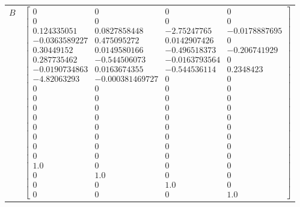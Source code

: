 \begin{tabular}{cl}
   $B$    & $\left[\begin{matrix}0 & 0 & 0 & 0\\0 & 0 & 0 & 0\\0.124335051 & 0.0827858448 & -2.75247765 & -0.0178887695\\-0.0363589227 & 0.475095272 & 0.0142907426 & 0\\0.30449152 & 0.0149580166 & -0.496518373 & -0.206741929\\0.287735462 & -0.544506073 & -0.0163793564 & 0\\-0.0190734863 & 0.0163674355 & -0.544536114 & 0.2348423\\-4.82063293 & -0.000381469727 & 0 & 0\\0 & 0 & 0 & 0\\0 & 0 & 0 & 0\\0 & 0 & 0 & 0\\0 & 0 & 0 & 0\\0 & 0 & 0 & 0\\0 & 0 & 0 & 0\\0 & 0 & 0 & 0\\0 & 0 & 0 & 0\\1.0 & 0 & 0 & 0\\0 & 1.0 & 0 & 0\\0 & 0 & 1.0 & 0\\0 & 0 & 0 & 1.0\end{matrix}\right]$                                                                                                                                                                                                                                                                                                                                                                                                                                                                                                                                                                                                                                                                                                                                                                                                                                                                                                                                                                                                                                                                                                                                                                                                                                                                                                                                                                                                                                                                                                                                                                                                                                                                                             \\

\end{tabular}
